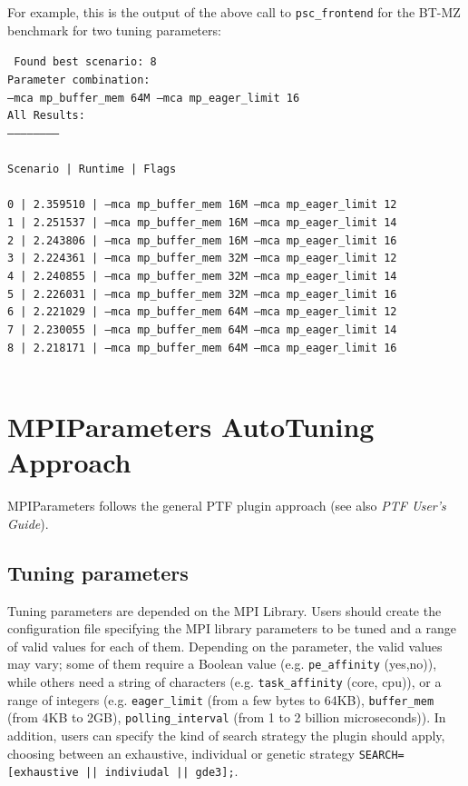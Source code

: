 \documentclass[11pt,a4paper, oneside]{book} %
\newenvironment{code}%
{
\addtolength{\leftskip}{0.5cm}}%
{

}
\begin{document}
For example, this is the output of the above call to \texttt{psc\_frontend} for the BT-MZ benchmark for two tuning parameters:

\begin{code}
\texttt{
Found best scenario: 8\\
Parameter combination: \\
--mca mp\_buffer\_mem 64M    --mca mp\_eager\_limit 16
\\
All Results:\\
-----------------------\\
\\
Scenario  |   Runtime    | Flags\\
\\
0         |	2.359510 | --mca mp\_buffer\_mem 16M --mca mp\_eager\_limit 12 \\
1         |	2.251537 | --mca mp\_buffer\_mem 16M --mca mp\_eager\_limit 14 \\
2         |	2.243806 | --mca mp\_buffer\_mem 16M --mca mp\_eager\_limit 16 \\
3         |	2.224361 | --mca mp\_buffer\_mem 32M --mca mp\_eager\_limit 12 \\
4         |	2.240855 | --mca mp\_buffer\_mem 32M --mca mp\_eager\_limit 14 \\
5         |	2.226031 | --mca mp\_buffer\_mem 32M --mca mp\_eager\_limit 16 \\
6         |	2.221029 | --mca mp\_buffer\_mem 64M --mca mp\_eager\_limit 12 \\
7         |	2.230055 | --mca mp\_buffer\_mem 64M --mca mp\_eager\_limit 14 \\
8         |	2.218171 | --mca mp\_buffer\_mem 64M --mca mp\_eager\_limit 16 \\
\\
}

\end{code}


\chapter{MPIParameters AutoTuning Approach}\label{sec:mappingPTF}
MPIParameters follows the general PTF plugin approach (see also \textit{PTF User's Guide}).

\section{Tuning parameters}

Tuning parameters are depended on the MPI Library.  Users should create the configuration file specifying the MPI library parameters to be tuned and a range of valid values for each of them. Depending on the parameter, the valid values may vary; some of them require a Boolean value (e.g. {\tt pe\_affinity} (yes,no)), while others need a string of characters (e.g. {\tt task\_affinity} (core, cpu)), or a range of integers (e.g. {\tt eager\_limit} (from a few bytes to 64KB), {\tt buffer\_mem} (from 4KB to 2GB), {\tt polling\_interval} (from 1 to 2 billion microseconds)). In addition, users can specify the kind of search strategy the plugin should apply, choosing between an exhaustive, individual or genetic strategy {\tt SEARCH=[exhaustive || indiviudal || gde3];}.
\end{document}
